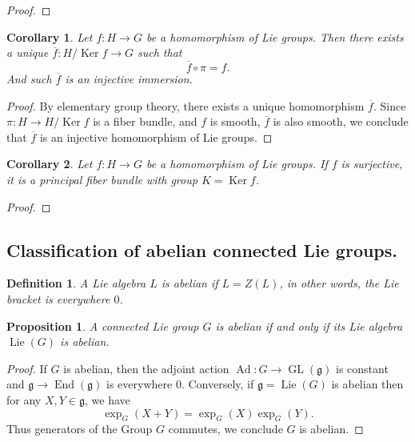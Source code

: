 \documentclass{article}
\newtheorem{proposition}{Proposition}[section]
\newtheorem{definition}{Definition}[section]
\newtheorem{corollary}{Corollary}[section]
\numberwithin{equation}{section}
\DeclareMathOperator{\Ker}{Ker}
\DeclareMathOperator{\Ad}{Ad}
\DeclareMathOperator{\End}{End}
\DeclareMathOperator{\GL}{GL}
\DeclareMathOperator{\Lie}{Lie}
\begin{document}
\begin{proof}
\end{proof}

\begin{corollary}
Let $f:H\to G$ be a homomorphism of Lie groups. Then there exists a unique $\overline{f}:H/\Ker f\to G$ such that 
\begin{equation*}
\overline{f}\circ\pi =f.
\end{equation*}
And such $\overline{f}$ is an injective immersion.
\end{corollary}

\begin{proof}
By elementary group theory, there exists a unique homomorphism $\overline{f}$. Since $\pi:H\to H/\Ker f$ is a fiber bundle, %
and $f$ is smooth, $\overline{f}$ is also smooth, we conclude that $\overline{f}$ is an injective homomorphism of Lie groups. 
\end{proof}

\begin{corollary}
Let $f:H\to G$ be a homomorphism of Lie groups. If $f$ is surjective, it is a principal fiber bundle with group $K=\Ker f$. 
\end{corollary}

\begin{proof}
\end{proof}

\subsection{Classification of abelian connected Lie groups.}

\begin{definition}
A Lie algebra $L$ is abelian if $L=Z(L)$, in other words, the Lie bracket is everywhere $0$. 
\end{definition}

\begin{proposition}
A connected Lie group $G$ is abelian if and only if its Lie algebra $\Lie(G)$ is abelian.
\end{proposition}

\begin{proof}
If $G$ is abelian, then the adjoint action $\Ad:G\to \GL(\mathfrak{g})$ is constant and $\mathfrak{g}\to\End(\mathfrak{g})$ is everywhere $0$. Conversely, if $\mathfrak{g}=\Lie(G)$ is abelian then for any $X,Y\in\mathfrak{g}$, we have
\begin{equation*}
\exp_G(X+Y) = \exp_G(X)\exp_G(Y).
\end{equation*}
Thus generators of the Group $G$ commutes, we conclude $G$ is abelian. 
\end{proof}
\end{document}
